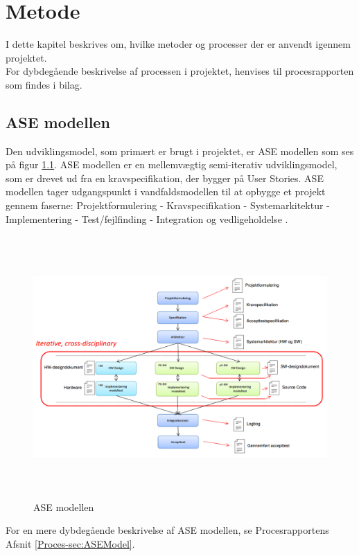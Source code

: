 \chapter{Metode}
I dette kapitel beskrives om, hvilke metoder og processer der er anvendt igennem projektet. \\
For dybdegående beskrivelse af processen i projektet, henvises til procesrapporten som findes i bilag.

\section{ASE modellen}
Den udviklingsmodel, som primært er brugt i projektet, er ASE modellen som ses på figur \ref{fig:ASE}. ASE modellen\cite{ASE} er en mellemvægtig semi-iterativ udviklingsmodel, som er drevet ud fra en kravspecifikation, der bygger på User Stories. ASE modellen tager udgangspunkt i vandfaldsmodellen til at opbygge et projekt gennem faserne: Projektformulering - Kravspecifikation - Systemarkitektur -  Implementering -  Test/fejlfinding -  Integration og vedligeholdelse \cite{ASE}.

\begin{figure} [!ht]
	\begin{center}
		\includegraphics[height=10cm, width=12cm]{Metode/ASEModellen}
	\end{center}
	\caption{ASE modellen \cite{ASE.}}
	\label{fig:ASE}
\end{figure}

For en mere dybdegående beskrivelse af ASE modellen, se Procesrapportens Afsnit \ref{Proces-sec:ASEModel}. \\

